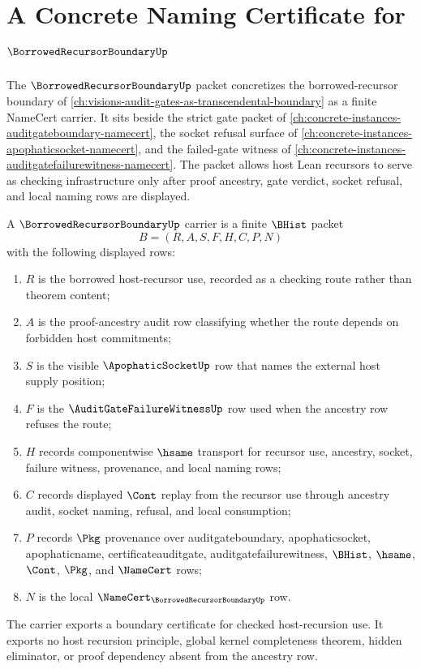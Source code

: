 \chapter{A Concrete Naming Certificate for $\BorrowedRecursorBoundaryUp$}
\label{ch:concrete-instances-borrowedrecursorboundary-namecert}

The $\BorrowedRecursorBoundaryUp$ packet concretizes the borrowed-recursor boundary of \autoref{ch:visions-audit-gates-as-transcendental-boundary} as a finite NameCert carrier. It sits beside the strict gate packet of \autoref{ch:concrete-instances-auditgateboundary-namecert}, the socket refusal surface of \autoref{ch:concrete-instances-apophaticsocket-namecert}, and the failed-gate witness of \autoref{ch:concrete-instances-auditgatefailurewitness-namecert}. The packet allows host Lean recursors to serve as checking infrastructure only after proof ancestry, gate verdict, socket refusal, and local naming rows are displayed.

\begin{definition}
\label{def:apophatic-borrowed-recursor-boundary-carrier}
A $\BorrowedRecursorBoundaryUp$ carrier is a finite $\BHist$ packet
$$
B=(R,A,S,F,H,C,P,N)
$$
with the following displayed rows:
\begin{enumerate}
\item $R$ is the borrowed host-recursor use, recorded as a checking route rather than theorem content;
\item $A$ is the proof-ancestry audit row classifying whether the route depends on forbidden host commitments;
\item $S$ is the visible $\ApophaticSocketUp$ row that names the external host supply position;
\item $F$ is the $\AuditGateFailureWitnessUp$ row used when the ancestry row refuses the route;
\item $H$ records componentwise $\hsame$ transport for recursor use, ancestry, socket, failure witness, provenance, and local naming rows;
\item $C$ records displayed $\Cont$ replay from the recursor use through ancestry audit, socket naming, refusal, and local consumption;
\item $P$ records $\Pkg$ provenance over auditgateboundary, apophaticsocket, apophaticname, certificateauditgate, auditgatefailurewitness, $\BHist$, $\hsame$, $\Cont$, $\Pkg$, and $\NameCert$ rows;
\item $N$ is the local $\NameCert_{\BorrowedRecursorBoundaryUp}$ row.
\end{enumerate}
The carrier exports a boundary certificate for checked host-recursion use. It exports no host recursion principle, global kernel completeness theorem, hidden eliminator, or proof dependency absent from the ancestry row.
\end{definition}

